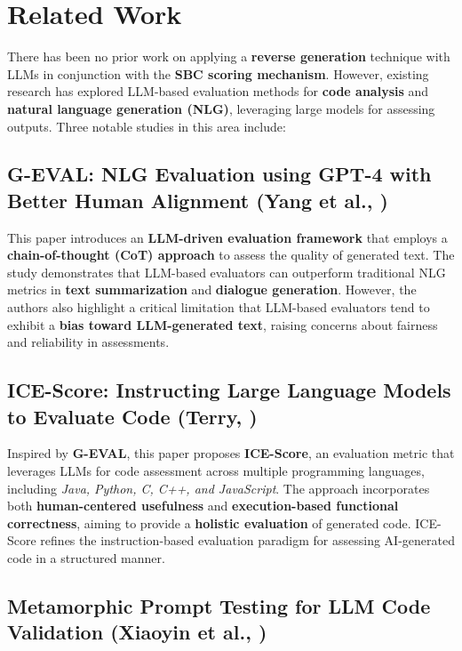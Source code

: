 \section{Related Work}
There has been no prior work on applying a \textbf{reverse generation} technique with LLMs in conjunction with the \textbf{SBC scoring mechanism}. However, existing research has explored LLM-based evaluation methods for \textbf{code analysis} and \textbf{natural language generation (NLG)}, leveraging large models for assessing outputs. Three notable studies in this area include:

\subsection{G-EVAL: NLG Evaluation using GPT-4 with Better Human Alignment (Yang et al., \cite{yang2023geval})}

This paper introduces an \textbf{LLM-driven evaluation framework} that employs a \textbf{chain-of-thought (CoT) approach} to assess the quality of generated text. The study demonstrates that LLM-based evaluators can outperform traditional NLG metrics in \textbf{text summarization} and \textbf{dialogue generation}. However, the authors also highlight a critical limitation that LLM-based evaluators tend to exhibit a \textbf{bias toward LLM-generated text}, raising concerns about fairness and reliability in assessments.

\subsection{ICE-Score: Instructing Large Language Models to Evaluate Code (Terry, \cite{terry2024icescore})}

Inspired by \textbf{G-EVAL}, this paper proposes \textbf{ICE-Score}, an evaluation metric that leverages LLMs for code assessment across multiple programming languages, including \textit{Java, Python, C, C++, and JavaScript}. The approach incorporates both \textbf{human-centered usefulness} and \textbf{execution-based functional correctness}, aiming to provide a \textbf{holistic evaluation} of generated code. ICE-Score refines the instruction-based evaluation paradigm for assessing AI-generated code in a structured manner.

\subsection{Metamorphic Prompt Testing for LLM Code Validation (Xiaoyin et al., \cite{wang2024validating} )}

